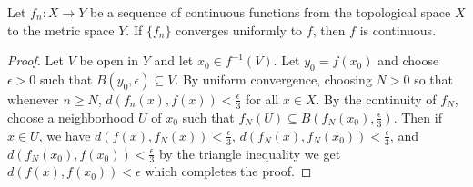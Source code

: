 \begin{theorem}\label{2.3.9}
    Let $f_n:X \rightarrow Y$ be a sequence of continuous functions from the topological space  $X$
    to the metric space  $Y$. If  $\{f_n\}$ converges uniformly to $f$, then  $f$ is continuous.
\end{theorem}
\begin{proof}
    Let $V$ be open in  $Y$ and let  $ x_0 \in f^{-1}(V)$. Let $ y_0=f(x_0)$ and choose $\epsilon>0$
    such that  $B(y_0,\epsilon) \subseteq V$. By uniform convergence, choosing $N>0$ so that
    whenever  $n \geq N$,  $d(f_n(x),f(x))<\frac{\epsilon}{3}$ for all $x \in X$. By the continuity
    of $f_N$, choose a neighborhood  $U$ of  $ x_0$ such that $f_N(U) \subseteq
    B(f_N(x_0),\frac{\epsilon}{3})$. Then if $x \in U$, we have
    $d(f(x),f_N(x))<\frac{\epsilon}{3}$, $d(f_N(x),f_N(x_0))<\frac{\epsilon}{3}$, and
    $d(f_N(x_0),f(x_0))<\frac{\epsilon}{3}$ by the triangle inequality we get
    $d(f(x),f(x_0))<\epsilon$ which completes the proof.
\end{proof}


